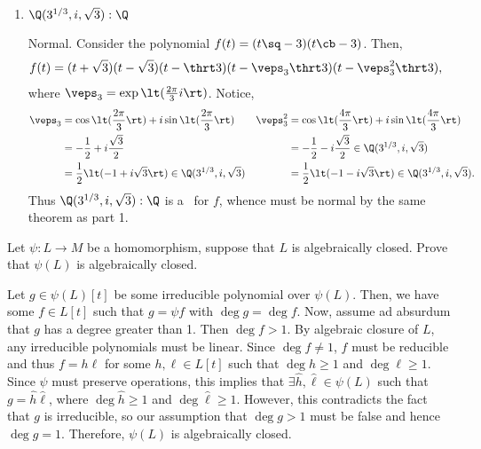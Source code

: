 \documentclass{article}
\begin{document}
\begin{enumerate}
\item \( \Q(3^{1/3},i,\sqrt 3):\Q \) %
\begin{solution}
Normal.
Consider the polynomial \( f(t) = (t\sq-3)(t\cb-3) \).
Then, \begin{align*}
  f(t) &= (t+\sqrt 3)(t-\sqrt 3)(t-\thrt 3)(t-\veps_3\thrt 3)(t-\veps_3^2\thrt 3),
\end{align*}
where \( \veps_3 = \exp\lt(\frac{2\pi}{3}i\rt) \).
Notice, \begin{align*}
  \veps_3 &= \cos\lt(\frac{2\pi}{3}\rt) + i\sin\lt(\frac{2\pi}{3}\rt)    & \veps_3^2 &= \cos\lt(\frac{4\pi}{3}\rt) + i\sin\lt(\frac{4\pi}{3}\rt) \\
          &= -\frac{1}{2}+i\frac{\sqrt 3}{2} & &= -\frac{1}{2}-i\frac{\sqrt 3}{2}\in \Q(3^{1/3},i,\sqrt 3) \\
          &= \frac{1}{2}\lt(-1+i\sqrt 3\rt)\in \Q(3^{1/3},i,\sqrt 3) & &= \frac{1}{2}\lt(-1-i\sqrt 3\rt) \in \Q(3^{1/3},i,\sqrt 3).
\end{align*}
Thus \( \Q(3^{1/3},i,\sqrt 3):\Q \) is a \sfe~for \( f \), whence must be normal by the same theorem as part 1.
\end{solution}
\end{enumerate}

\begin{exercise} %
  Let \( \psi:L \to M \) be a homomorphism, suppose that \( L \) is algebraically closed.
  Prove that \( \psi(L) \) is algebraically closed.
\end{exercise}
\begin{solution}
  Let \( g\in \psi(L)[t] \) be some irreducible polynomial over \( \psi(L) \).
  Then, we have some \( f \in L[t] \) such that \( g=\psi f \) with \( \deg g = \deg f \).
  Now, assume ad absurdum that \( g \) has a degree greater than 1.
  Then \( \deg f > 1 \).
  By algebraic closure of \( L \), any irreducible polynomials must be linear.
  Since \( \deg f \neq 1 \), \( f \) must be reducible and thus \( f = h\ell \) for some \( h,\ell\in L[t] \) such that \( \deg h \geq 1 \) and \( \deg \ell \geq 1 \).
  Since \( \psi \) must preserve operations, this implies that \( \exists \hat h,\hat \ell\in \psi(L) \) such that \( g=\hat h\hat \ell \), where \( \deg \hat h \geq 1 \) and \( \deg\hat\ell \geq 1 \).
  However, this contradicts the fact that \( g \) is irreducible, so our assumption that \( \deg g > 1 \) must be false and hence \( \deg g = 1 \).
  Therefore, \( \psi(L) \) is algebraically closed.
\end{solution}
\end{document}
